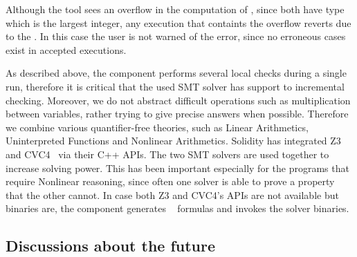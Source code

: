 Although the tool sees an overflow in the computation of , since
both have type  which is the largest integer, any execution that
containts the overflow reverts due to the .
%
In this case the user is not warned of the error, since no erroneous cases
exist in accepted executions.

As described above, the component performs several local checks during a single
run, therefore it is critical that the used SMT solver has support to
incremental checking.
%
Moreover, we do not abstract difficult operations such as multiplication
between variables, rather trying to give precise answers when possible.
%
Therefore we combine various quantifier-free theories, such as Linear
Arithmetics, Uninterpreted Functions and Nonlinear Arithmetics. 
%
Solidity has integrated Z3~\cite{Z3} and CVC4~\cite{CVC4} via their C++ APIs.
%
The two SMT solvers are used together to increase solving power.
%
This has been important especially for the programs that require Nonlinear
reasoning, since often one solver is able to prove a property that the other
cannot.
%
In case both Z3 and CVC4's APIs are not available but binaries are, the
component generates ~\cite{SMTLIB} formulas and invokes the
solver binaries.


\subsection{Discussions about the future}

\\
\\
